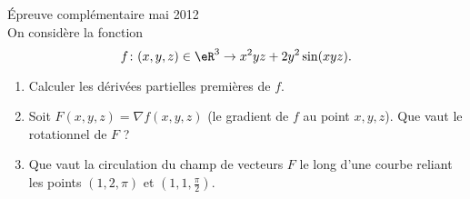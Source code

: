 
\begin{exercice}\label{exoDerive-0008} Épreuve complémentaire mai 2012\\

    On considère la fonction
    \begin{equation}
        f\colon (x,y,z)\in \eR^3\to x^2yz+2y^2\sin(xyz).
    \end{equation}
    \begin{enumerate}
        \item
            Calculer les dérivées partielles premières de \( f\).
        \item
            Soit \( F(x,y,z)=\nabla f(x,y,z)\) (le gradient de \( f\) au point \( x,y,z\)). Que vaut le rotationnel de \( F\) ?
        \item
            Que vaut la circulation du champ de vecteurs \( F\) le long d'une courbe reliant les points \( (1,2,\pi)\) et \( (1,1,\frac{ \pi }{2})\).
    \end{enumerate}

\end{exercice}

